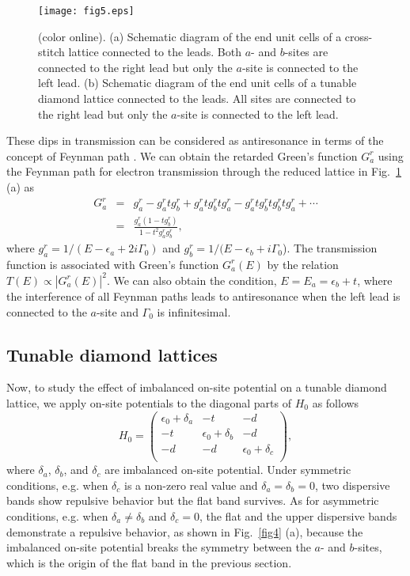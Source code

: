 \documentclass[twocolumn,showpacs,epsfig,pre]{revtex4}
\newcommand{\figsizeone}{0.48}
\begin{document}
\begin{figure}
\begin{center}
\texttt{[image: fig5.eps]}
\caption{(color online).
(a) Schematic diagram of the end unit cells of a cross-stitch lattice connected to the leads.
Both $a$- and $b$-sites are connected to the right lead but only the $a$-site is connected to the left lead.
(b) Schematic diagram of the end unit cells of a tunable diamond lattice connected to the leads.
All sites are connected to the right lead but only the $a$-site is connected to the left lead.
}
\label{fig5}
\end{center}
\end{figure}

These dips in transmission can be considered as antiresonance in terms of the concept of Feynman path \cite{Dat97, Bao05}.
We can obtain the retarded Green's function $G^r_a$ using the Feynman path for electron transmission through the reduced lattice in Fig.~\ref{fig5} (a) as
\begin{eqnarray}
\label{green}
G^r_a &=& g^r_a - g^r_a t g^r_b + g^r_a t g^r_b t g^r_a - g^r_a t g^r_b t g^r_b t g^r_a + \cdots \\
           &=& \frac{g^r_a (1-t g^r_b)}{1-t^2 g^r_a g^r_b},
\end{eqnarray}
where $g^r_a = 1/(E - \epsilon_a + 2 i \Gamma_0)$ and $g^r_b = 1/(E-\epsilon_b + i \Gamma_0$). The transmission function is associated with Green's function $G^r_a (E)$ by the relation $T(E) \propto \left| G^r_a (E) \right|^2$. We can also obtain the condition, $E = E_a = \epsilon_b+t$, where the interference of all Feynman paths leads to antiresonance when the left lead is connected to the $a$-site and $\Gamma_0$ is infinitesimal.

\subsection{Tunable diamond lattices}

Now, to study the effect of imbalanced on-site potential on a tunable diamond lattice, we apply on-site potentials to the diagonal parts of $H_0$ as follows 
\begin{equation}
 H_0 = \left(\begin{array}{ccc}
 \epsilon_0 + \delta_a & -t & -d \\
 -t & \epsilon_0 + \delta_b & -d \\
 -d & -d & \epsilon_0 + \delta_c \\
\end{array}\right),
\end{equation}
where $\delta_a$, $\delta_b$, and $\delta_c$ are imbalanced on-site potential.
Under symmetric conditions, e.g. when $\delta_c$ is a non-zero real value and $\delta_a=\delta_b=0$, two dispersive bands show repulsive behavior but the flat band survives. As for asymmetric conditions, e.g. when $\delta_a \neq \delta_b$ and $\delta_c = 0$, the flat and the upper dispersive bands demonstrate a repulsive behavior, as shown in Fig.~\ref{fig4} (a), because the imbalanced on-site potential breaks the symmetry between the $a$- and $b$-sites, which is the origin of the flat band in the previous section.
\end{document}
